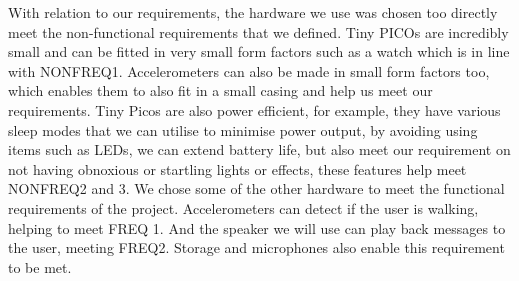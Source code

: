             With relation to our requirements, the
            hardware we use was chosen too directly meet the non-functional requirements that we defined. Tiny PICOs are
            incredibly small and can be fitted in very small form factors such as a watch which is in line with NONFREQ1.
            Accelerometers can also be made in small form factors too, which enables them to also fit in a small casing and help
            us meet our requirements. Tiny Picos are also power efficient, for example, they have various sleep modes that we
            can utilise to minimise power output, by avoiding using items such as LEDs, we can extend battery life, but also
            meet our requirement on not having obnoxious or startling lights or effects, these features help meet NONFREQ2 and
            3. We chose some of the other hardware to meet the functional requirements of the project. Accelerometers can detect
            if the user is walking, helping to meet FREQ 1. And the speaker we will use can play back messages to the user,
            meeting FREQ2. Storage and microphones also enable this requirement to be met.


    
